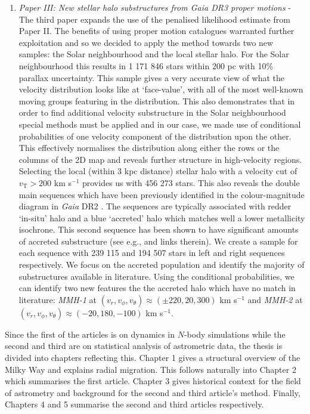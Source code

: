 \begin{enumerate}
    \item \textit{Paper III: New stellar halo substructures from Gaia DR3 proper motions} - The third paper expands the use of the penalised likelihood estimate from Paper II. The benefits of using proper motion catalogues warranted further exploitation and so we decided to apply the method towards two new samples: the Solar neighbourhood and the local stellar halo. For the Solar neighbourhood this results in 1 171 846 stars within 200 pc with 10\% parallax uncertainty. This sample gives a very accurate view of what the velocity distribution looks like at `face-value', with all of the most well-known moving groups featuring in the distribution. This also demonstrates that in order to find additional velocity substructure in the Solar neighbourhood special methods must be applied and in our case, we made use of conditional probabilities of one velocity component of the distribution upon the other. This effectively normalises the distribution along either the rows or the columns of the 2D map and reveals further structure in high-velocity regions. Selecting the local (within 3 kpc distance) stellar halo with a velocity cut of $v_\mathrm{T} > 200$ km s$^{-1}$ provides us with 456 273 stars. This also reveals the double main sequences which have been previously identified in the colour-magnitude diagram in \textit{Gaia} DR2 \cite{dr2:hr}. The sequences are typically associated with redder `in-situ' halo and a blue `accreted' halo which matches well a lower metallicity isochrone. This second sequence has been shown to have significant amounts of accreted substructure (see e.g., \citealt{koppelman:19} and links therein). We create a sample for each sequence with 239 115 and 194 507 stars in left and right sequences respectively. We focus on the accreted population and identify the majority of substructures available in literature. Using the conditional probabilities, we can identify two new features the the accreted halo which have no match in literature: \textit{MMH-1} at $(v_r, v_\phi, v_\theta) \approx (\pm220, 20, 300)$ km s$^{-1}$ and \textit{MMH-2} at $(v_r, v_\phi, v_\theta) \approx (-20, 180, -100)$ km s$^{-1}$.
\end{enumerate}

Since the first of the articles is on dynamics in $N$-body simulations while the second and third are on statistical analysis of astrometric data, the thesis is divided into chapters reflecting this. Chapter 1 gives a structural overview of the Milky Way and explains radial migration. This follows naturally into Chapter 2 which summarises the first article. Chapter 3 gives historical context for the field of astrometry and background for the second and third article's method. Finally, Chapters 4 and 5 summarise the second and third articles respectively. 